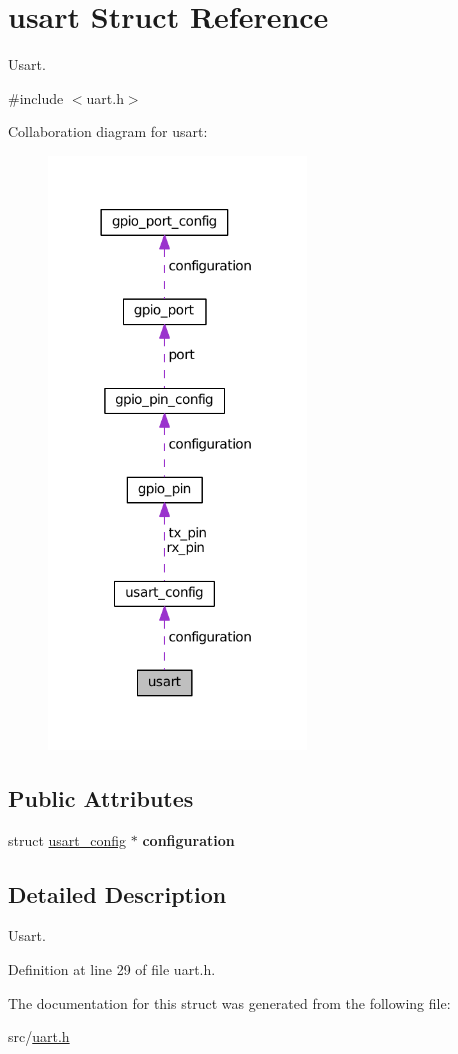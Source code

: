 \hypertarget{structusart}{}\section{usart Struct Reference}
\label{structusart}


Usart.  




{\ttfamily \#include $<$uart.\+h$>$}



Collaboration diagram for usart\+:\nopagebreak
\begin{figure}[H]
\begin{center}
\leavevmode
\includegraphics[width=194pt]{structusart__coll__graph}
\end{center}
\end{figure}
\subsection*{Public Attributes}
\begin{DoxyCompactItemize}
\item 
\hypertarget{structusart_a42f49f07a75c1ec44a8a1e04e08a760c}{}struct \hyperlink{structusart__config}{usart\+\_\+config} $\ast$ {\bfseries configuration}\label{structusart_a42f49f07a75c1ec44a8a1e04e08a760c}

\end{DoxyCompactItemize}


\subsection{Detailed Description}
Usart. 

Definition at line 29 of file uart.\+h.



The documentation for this struct was generated from the following file\+:\begin{DoxyCompactItemize}
\item 
src/\hyperlink{uart_8h}{uart.\+h}\end{DoxyCompactItemize}
